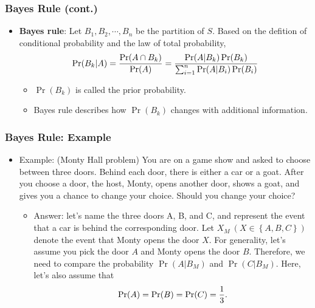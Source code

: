 \documentclass[pdflatex, 12pt]{beamer}
\begin{document}
\begin{frame}
\frametitle{Bayes Rule (cont.)}
\begin{itemize}
\item \textbf{Bayes rule}: Let $B_1, B_2, \cdots, B_n$ be the partition of $S$. Based on the defition of conditional probability and the law of total probability, 
 \begin{equation}
 \Pr(B_k|A) = \frac{\Pr(A \cap B_k)}{\Pr(A)} = \frac{\Pr(A|B_k)\Pr(B_k)}{\sum_{i = 1}^{n} \Pr(A|B_i)\Pr(B_i)} \notag
 \end{equation}
 \begin{itemize}
 \item $\Pr(B_k)$ is called the prior probability.
 \item Bayes rule describes how $\Pr(B_k)$ changes with additional information.
 \end{itemize}
\end{itemize}
\end{frame}

\begin{frame}
\frametitle{Bayes Rule: Example}
\begin{itemize}
\item Example: (Monty Hall problem) You are on a game show and asked to choose between three doors. Behind each door, there is either a car or a goat. After you choose a door, the host, Monty, opens another door, shows a goat, and gives you a chance to change your choice. Should you change your choice?
\vspace{0.4cm}
 \begin{itemize}
 \item Answer: let's name the three doors A, B, and C, and represent the event that a car is behind the corresponding door. Let $X_{M} \ (X \in \left\{A, B, C\right\})$ denote the event that Monty opens the door $X$. For generality, let's assume you pick the door $A$ and Monty opens the door $B$. Therefore, we need to compare the probability $\Pr(A|B_{M})$ and $\Pr(C|B_{M})$. Here, let's also assume that
  \begin{equation}
  \Pr(A) = \Pr(B) = \Pr(C) = \frac{1}{3}. \notag
  \end{equation}  
 \end{itemize}
\end{itemize}
\end{frame}
\end{document}
